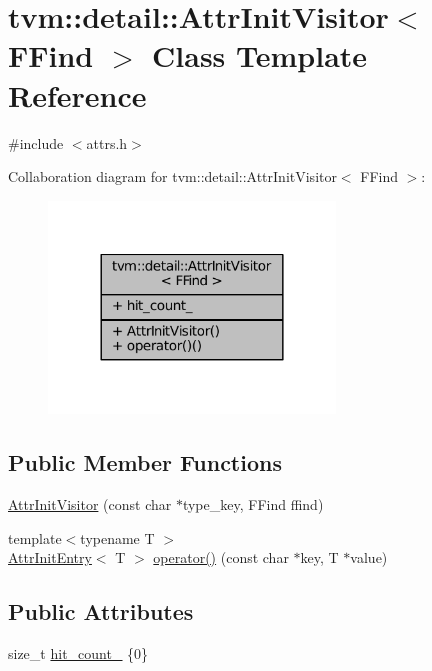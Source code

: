 \hypertarget{classtvm_1_1detail_1_1AttrInitVisitor}{}\section{tvm\+:\+:detail\+:\+:Attr\+Init\+Visitor$<$ F\+Find $>$ Class Template Reference}
\label{classtvm_1_1detail_1_1AttrInitVisitor}


{\ttfamily \#include $<$attrs.\+h$>$}



Collaboration diagram for tvm\+:\+:detail\+:\+:Attr\+Init\+Visitor$<$ F\+Find $>$\+:
\nopagebreak
\begin{figure}[H]
\begin{center}
\leavevmode
\includegraphics[width=216pt]{classtvm_1_1detail_1_1AttrInitVisitor__coll__graph}
\end{center}
\end{figure}
\subsection*{Public Member Functions}
\begin{DoxyCompactItemize}
\item 
\hyperlink{classtvm_1_1detail_1_1AttrInitVisitor_ac3c800c9249fee195db2a5fa473fe960}{Attr\+Init\+Visitor} (const char $\ast$type\+\_\+key, F\+Find ffind)
\item 
{\footnotesize template$<$typename T $>$ }\\\hyperlink{structtvm_1_1detail_1_1AttrInitEntry}{Attr\+Init\+Entry}$<$ T $>$ \hyperlink{classtvm_1_1detail_1_1AttrInitVisitor_af0856406dd74c88334291da4eff0543d}{operator()} (const char $\ast$key, T $\ast$value)
\end{DoxyCompactItemize}
\subsection*{Public Attributes}
\begin{DoxyCompactItemize}
\item 
size\+\_\+t \hyperlink{classtvm_1_1detail_1_1AttrInitVisitor_a40694e8ade57b3e5167ec74404188f9e}{hit\+\_\+count\+\_\+} \{0\}
\end{DoxyCompactItemize}


